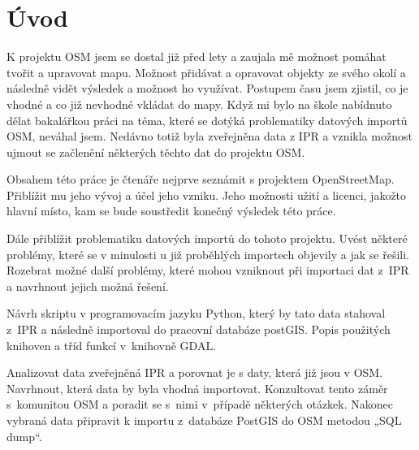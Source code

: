 \chapter{Úvod}
\label{1-uvod}

K projektu OSM jsem se dostal již před lety a zaujala mě možnost pomáhat tvořit 
a upravovat mapu. Možnost přidávat a opravovat objekty ze svého okolí a následně 
vidět výsledek a možnost ho využívat. Postupem času jsem zjistil, co je vhodné a 
co již nevhodné vkládat do mapy. Když mi bylo na škole nabídnuto dělat 
bakalářkou práci na téma, které se dotýká problematiky datových importů OSM, 
neváhal jsem. Nedávno totiž byla zveřejněna data z IPR a vznikla možnost ujmout 
se začlenění některých těchto dat do projektu OSM. 

Obsahem této práce je čtenáře nejprve seznámit s projektem OpenStreetMap. 
Přiblížit mu jeho vývoj a účel jeho vzniku. Jeho možnosti užití a licenci, 
jakožto hlavní místo, kam se bude soustředit konečný výsledek této práce.

Dále přiblížit problematiku datových importů do tohoto projektu. Uvést některé 
problémy, které se v minulosti u již proběhlých importech objevily a jak se 
řešili. Rozebrat možné další problémy, které mohou vzniknout při importaci dat 
z~IPR a navrhnout jejich možná řešení. 

Návrh skriptu v programovacím jazyku Python, který by tato data stahoval z~IPR 
a následně importoval do pracovní databáze postGIS. Popis použitých knihoven a 
tříd funkcí v~knihovně GDAL.

Analizovat data zveřejněná IPR a porovnat je s daty, která již jsou v OSM. 
Navrhnout, která data by byla vhodná importovat. Konzultovat tento záměr 
s~komunitou OSM a poradit se s~nimi v~případě některých otázkek. Nakonec 
vybraná data připravit k importu z~databáze PostGIS do OSM metodou „SQL dump“.

